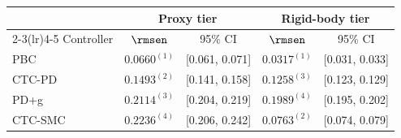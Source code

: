 \begin{tabular}{lcccc}
\toprule
& \multicolumn{2}{c}{Proxy tier} & \multicolumn{2}{c}{Rigid-body tier} \\
\cmidrule(lr){2-3}\cmidrule(lr){4-5}
Controller & $\rmsen$ & 95\% CI & $\rmsen$ & 95\% CI \\
\midrule
PBC     & $0.0660^{(1)}$ & [0.061, 0.071] & $0.0317^{(1)}$ & [0.031, 0.033] \\
CTC-PD  & $0.1493^{(2)}$ & [0.141, 0.158] & $0.1258^{(3)}$ & [0.123, 0.129] \\
PD+g    & $0.2114^{(3)}$ & [0.204, 0.219] & $0.1989^{(4)}$ & [0.195, 0.202] \\
CTC-SMC & $0.2236^{(4)}$ & [0.206, 0.242] & $0.0763^{(2)}$ & [0.074, 0.079] \\
\bottomrule
\end{tabular}
